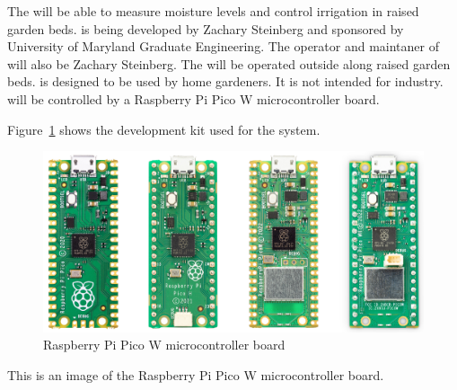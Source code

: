 The \ThisSystem will be able to measure moisture levels and control irrigation in raised garden beds. 
\ThisSys is being developed by Zachary Steinberg and sponsored by University of Maryland Graduate Engineering. 
The operator and maintaner of \ThisSys will also be Zachary Steinberg. The \ThisSys will be operated outside along raised garden beds. 
\ThisSys is designed to be used by home gardeners. It is not intended for industry. \ThisSys will be controlled by a Raspberry Pi Pico W microcontroller board.

Figure~\ref{fig:SystemOverview} shows the development kit used for the \ThisSys system. 
\begin{figure}[htbp]
	\centering
		\includegraphics[width=6in]{images/pico_family.jpg}
		\caption{Raspberry Pi Pico W microcontroller board}
	\label{fig:SystemOverview}
\end{figure}
This is an image of the Raspberry Pi Pico W microcontroller board.







